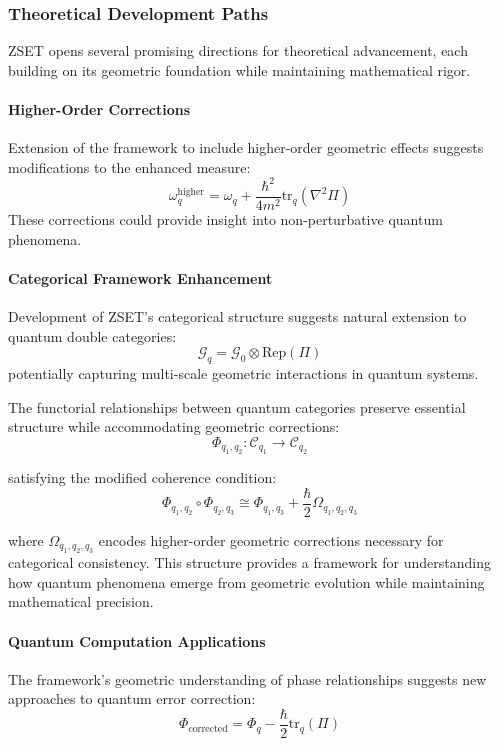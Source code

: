 \documentclass[10pt]{article}
\begin{document}
\subsubsection{Theoretical Development Paths}

ZSET opens several promising directions for theoretical advancement, each building on its geometric foundation while maintaining mathematical rigor.

\paragraph{Higher-Order Corrections}

Extension of the framework to include higher-order geometric effects suggests modifications to the enhanced measure:
\[
\omega_q^\text{higher} = \omega_q + \frac{\hbar^2}{4m^2} \text{tr}_q (\nabla^2\Pi)
\]
These corrections could provide insight into non-perturbative quantum phenomena.

\paragraph{Categorical Framework Enhancement}

Development of ZSET's categorical structure suggests natural extension to quantum double categories:
\[
\mathcal{G}_q = \mathcal{G}_0 \otimes \text{Rep}(\Pi)
\]
potentially capturing multi-scale geometric interactions in quantum systems.

The functorial relationships between quantum categories preserve essential structure while accommodating geometric corrections:
\[
\Phi_{q_1,q_2}: \mathcal{C}_{q_1} \to \mathcal{C}_{q_2}
\]

satisfying the modified coherence condition:
\[
\Phi_{q_1,q_2} \circ \Phi_{q_2,q_3} \cong \Phi_{q_1,q_3} + \frac{\hbar}{2}\Omega_{q_1,q_2,q_3}
\]

where $\Omega_{q_1,q_2,q_3}$ encodes higher-order geometric corrections necessary for categorical consistency. This structure provides a framework for understanding how quantum phenomena emerge from geometric evolution while maintaining mathematical precision.

\paragraph{Quantum Computation Applications}

The framework's geometric understanding of phase relationships suggests new approaches to quantum error correction:
\[
\Phi_\text{corrected} = \Phi_q - \frac{\hbar}{2}\text{tr}_q (\Pi)
\]
\end{document}
